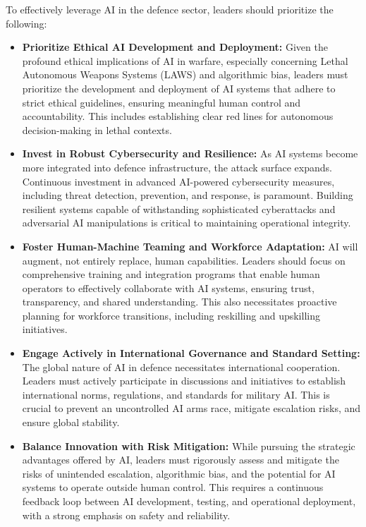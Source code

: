 To effectively leverage AI in the defence sector, leaders should prioritize the following:
\begin{itemize}
    \item \textbf{Prioritize Ethical AI Development and Deployment:}
Given the profound ethical implications of AI in warfare, especially concerning Lethal Autonomous Weapons Systems (LAWS) and algorithmic bias, leaders must prioritize the development and deployment of AI systems that adhere to strict ethical guidelines, ensuring meaningful human control and accountability. This includes establishing clear red lines for autonomous decision-making in lethal contexts.
    \item \textbf{Invest in Robust Cybersecurity and Resilience:}
As AI systems become more integrated into defence infrastructure, the attack surface expands. Continuous investment in advanced AI-powered cybersecurity measures, including threat detection, prevention, and response, is paramount. Building resilient systems capable of withstanding sophisticated cyberattacks and adversarial AI manipulations is critical to maintaining operational integrity.
    \item \textbf{Foster Human-Machine Teaming and Workforce Adaptation:}
AI will augment, not entirely replace, human capabilities. Leaders should focus on comprehensive training and integration programs that enable human operators to effectively collaborate with AI systems, ensuring trust, transparency, and shared understanding. This also necessitates proactive planning for workforce transitions, including reskilling and upskilling initiatives.
    \item \textbf{Engage Actively in International Governance and Standard Setting:}
The global nature of AI in defence necessitates international cooperation. Leaders must actively participate in discussions and initiatives to establish international norms, regulations, and standards for military AI. This is crucial to prevent an uncontrolled AI arms race, mitigate escalation risks, and ensure global stability.
    \item \textbf{Balance Innovation with Risk Mitigation:}
While pursuing the strategic advantages offered by AI, leaders must rigorously assess and mitigate the risks of unintended escalation, algorithmic bias, and the potential for AI systems to operate outside human control. This requires a continuous feedback loop between AI development, testing, and operational deployment, with a strong emphasis on safety and reliability.
\end{itemize}

